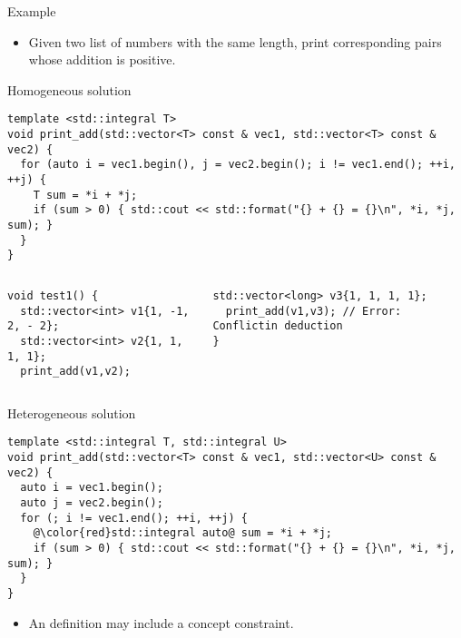 \begin{frame}[t,fragile]{Example}
  \begin{itemize}
    \item Given two list of numbers with the same length, 
          print corresponding pairs whose addition is positive.
  \end{itemize}
\begin{block}{Homogeneous solution}
\begin{lstlisting}
template <std::integral T>
void print_add(std::vector<T> const & vec1, std::vector<T> const & vec2) {
  for (auto i = vec1.begin(), j = vec2.begin(); i != vec1.end(); ++i, ++j) {
    T sum = *i + *j;
    if (sum > 0) { std::cout << std::format("{} + {} = {}\n", *i, *j, sum); }
  }
}
\end{lstlisting}
\end{block}

\begin{columns}[T]
\begin{lstlisting}[basicstyle=\tiny]
void test1() {
  std::vector<int> v1{1, -1, 2, - 2};
  std::vector<int> v2{1, 1, 1, 1};
  print_add(v1,v2);
\end{lstlisting}

\begin{lstlisting}[basicstyle=\tiny]
  std::vector<long> v3{1, 1, 1, 1};
  print_add(v1,v3); // Error: Conflictin deduction
}
\end{lstlisting}
\end{columns}

\end{frame}

\begin{frame}[t,fragile]
\begin{block}{Heterogeneous solution}
\begin{lstlisting}[escapechar=@]
template <std::integral T, std::integral U>
void print_add(std::vector<T> const & vec1, std::vector<U> const & vec2) {
  auto i = vec1.begin();
  auto j = vec2.begin();
  for (; i != vec1.end(); ++i, ++j) {
    @\color{red}std::integral auto@ sum = *i + *j;
    if (sum > 0) { std::cout << std::format("{} + {} = {}\n", *i, *j, sum); }
  }
}
\end{lstlisting}
\end{block}
\begin{itemize}
  \item An  definition may include a concept constraint.
\end{itemize}
\end{frame}

